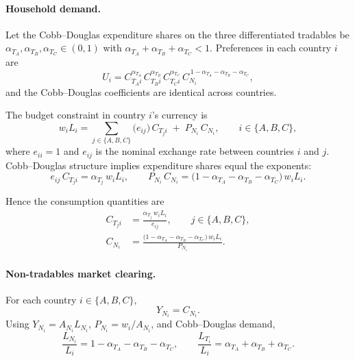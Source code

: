 \documentclass[11pt]{article}
\begin{document}
\paragraph{Household demand.}
Let the Cobb--Douglas expenditure shares on the three differentiated tradables be 
$\alpha_{T_A}, \alpha_{T_B}, \alpha_{T_C} \in (0,1)$ with 
$\alpha_{T_A} + \alpha_{T_B} + \alpha_{T_C} < 1$.
Preferences in each country $i$ are
\[
U_i 
= 
C_{T_A i}^{\alpha_{T_A}}\,
C_{T_B i}^{\alpha_{T_B}}\,
C_{T_C i}^{\alpha_{T_C}}\,
C_{N_i}^{\,1-\alpha_{T_A}-\alpha_{T_B}-\alpha_{T_C}},
\]
and the Cobb--Douglas coefficients are identical across countries.

The budget constraint in country $i$’s currency is
\[
w_i L_i
=
\sum_{j\in\{A,B,C\}}
\big( e_{ij} \big)\, C_{T_j i}
\;+\;
P_{N_i}\, C_{N_i},
\qquad i \in \{A,B,C\},
\]
where $e_{ii}=1$ and $e_{ij}$ is the nominal exchange rate between countries $i$ and $j$.
Cobb--Douglas structure implies expenditure shares equal the exponents:
\[
e_{ij}\, C_{T_j i}
=
\alpha_{T_j}\, w_i L_i,
\qquad
P_{N_i}\, C_{N_i}
=
\big(1-\alpha_{T_A}-\alpha_{T_B}-\alpha_{T_C}\big)\, w_i L_i.
\]

Hence the consumption quantities are
\begin{align}
C_{T_j i}
&=
\frac{\alpha_{T_j}\, w_i L_i}{e_{ij}},
\qquad j \in \{A,B,C\},
\\[4pt]
C_{N_i}
&=
\frac{\big(1-\alpha_{T_A}-\alpha_{T_B}-\alpha_{T_C}\big)\, w_i L_i}{P_{N_i}}.
\end{align}

\paragraph{Non-tradables market clearing.}
For each country $i \in \{A,B,C\}$,
\begin{equation}
Y_{N_i} = C_{N_i}.
\end{equation}
Using $Y_{N_i} = A_{N_i} L_{N_i}$, $P_{N_i} = w_i / A_{N_i}$, and Cobb--Douglas demand,
\begin{equation}
\frac{L_{N_i}}{L_i} 
= 1 - \alpha_{T_A} - \alpha_{T_B} - \alpha_{T_C},
\qquad
\frac{L_{T_i}}{L_i}
= \alpha_{T_A} + \alpha_{T_B} + \alpha_{T_C}.
\end{equation}
\end{document}

